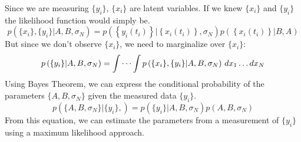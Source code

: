 \documentclass[%
 reprint,
 amsmath,amssymb,
 aps,
]{revtex4-1}
\begin{document}
Since we are measuring $\{y_{i}\}$, $\{x_{i}\}$ are latent variables.  If we knew $\{x_{i}\}$ and $\{y_{i}\}$ the likelihood function would simply be.
\begin{equation}
	p\left( \{x_{i}\},\{y_{i}\}|A,B,\sigma_{N}\right) = 
	p\left( \left\{y_i(t_i)\right\} \left| \left\{x_i(t_i)\right\},\sigma_{N} \right.\right)
	p\left( \left\{x_i(t_i)\right\} \left| B, A \right.\right)
\end{equation}
But since we don't observe $\{x_{i}\}$, we need to marginalize over $\{x_{i}\}$:
\begin{equation}
p\left( \{y_{i}\}|A,B,\sigma_{N}\right) = \idotsint p\left( \{x_{i}\},\{y_{i}\}|A,B,\sigma_{N}\right) \,dx_1 \dots dx_N
\end{equation}
Using Bayes Theorem, we can express the conditional probability of the parameters $\{A,B,\sigma_{N}\}$ given the measured data $\{y_{i}\}$.
\begin{equation}
	p\left( \{A,B,\sigma_{N}\}|\{y_{i}\},\right) =
	p\left( \{y_{i}\}|A,B,\sigma_{N}\right)p\left(A,B,\sigma_{N}\right)
\end{equation}
From this equation, we can estimate the parameters from a measurement of $\{y_{i}\}$ using a maximum likelihood approach.
\end{document}
